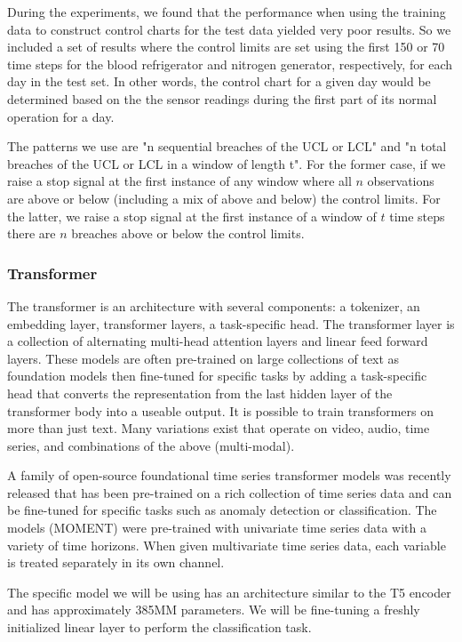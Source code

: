 \documentclass[12pt]{article}
\begin{document}
During the experiments, we found that the performance when using the training data to construct
control charts for the test data yielded very poor results. So we included a set of results where
the control limits are set using the first 150 or 70 time steps for the blood refrigerator and nitrogen
generator, respectively, for each day in the test set. In other words, the control chart for a given day
would be determined based on the the sensor readings during the first part of its normal operation for a day.

The patterns we use are "n sequential breaches of the UCL or LCL" and "n total breaches of the UCL or LCL in a
window of length t". For the former case, if we raise a stop signal at the first instance of any window where all 
$n$ observations are above or below (including a mix of above and below) the control limits. For the latter, we 
raise a stop signal at the first instance of a window of $t$ time steps there are $n$ breaches above or below
the control limits.


\subsubsection{Transformer}

The transformer is an architecture with several components: a tokenizer, an embedding layer,
transformer layers, a task-specific head\cite{vaswani_attention_2023}. The transformer layer
is a collection of alternating multi-head attention layers and linear feed forward layers.
These models are often pre-trained on large collections of text as foundation models then
fine-tuned for specific tasks by adding a task-specific head that converts the representation
from the last hidden layer of the transformer body into a useable output. It is possible to
train transformers on more than just text. Many variations exist that operate on video, audio,
time series, and combinations of the above (multi-modal).

A family of open-source foundational time series transformer models was recently released\cite{goswami_moment_2024}
that has been pre-trained on a rich collection of time series data and can be fine-tuned for
specific tasks such as anomaly detection or classification. The models (MOMENT) were pre-trained
with univariate time series data with a variety of time horizons. When given multivariate
time series data, each variable is treated separately in its own channel.

The specific model we will be using has an architecture similar to the T5 encoder\cite{Raffel2019ExploringTL}
and has approximately 385MM parameters. We will be fine-tuning a freshly initialized linear
layer to perform the classification task.
\end{document}
